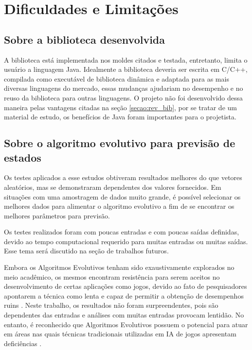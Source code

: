 \section{Dificuldades e Limitações}

\subsection{Sobre a biblioteca desenvolvida}

A biblioteca está implementada nos moldes citados e testada, entretanto, limita o usuário a linguagem Java. Idealmente a biblioteca deveria ser escrita em C/C++, compilada como executável de biblioteca dinâmica e adaptada para as mais diversas linguagens do mercado, essas mudanças ajudariam no desempenho e no reuso da biblioteca para outras linguagens. O projeto não foi desenvolvido dessa maneira pelas vantagens citadas na seção \ref{secao:rev_bib}, por se tratar de um material de estudo, os benefícios de Java foram importantes para o projetista.

\subsection{Sobre o algoritmo evolutivo para previsão de estados}

Os testes aplicados a esse estudos obtiveram resultados melhores do que vetores aleatórios, mas se demonstraram dependentes dos valores fornecidos. Em situações com uma amostragem de dados muito grande, é possível selecionar os melhores dados para alimentar o algoritmo evolutivo a fim de se encontrar os melhores parâmetros para previsão.

Os testes realizados foram com poucas entradas e com poucas saídas definidas, devido ao tempo computacional requerido para muitas entradas ou muitas saídas. Esse tema será discutido na seção de trabalhos futuros.

Embora os Algoritmos Evolutivos tenham sido exaustivamente explorados no meio acadêmico, os mesmos encontram resistência para serem aceitos no desenvolvimento de certas aplicações como jogos, devido ao fato de pesquisadores apontarem a técnica como lenta e capaz de permitir a obtenção de desempenhos ruins \cite{Sweetser2002} \cite{Spronck2003} \cite{Marcio2008}. Neste trabalho, os resultados não foram surpreendentes, pois são dependentes das entradas e análises com muitas entradas provocam lentidão. No entanto, é reconhecido que Algoritmos Evolutivos possuem o potencial para atuar em áreas nas quais técnicas tradicionais utilizadas em IA de jogos apresentam deficiências \cite{YANNAKAKIS2005}.